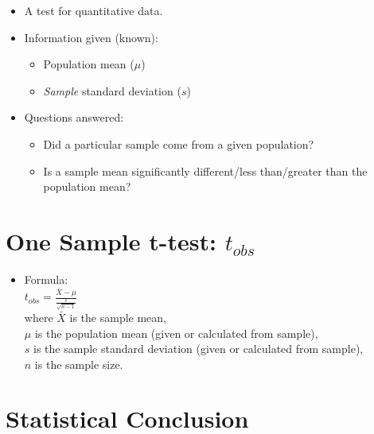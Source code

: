 \documentclass[12pt]{article}
\begin{document}
\begin{itemize}
\itemsep1pt\parskip0pt
\item
  A test for quantitative data.
\item
  Information given (known):

  \begin{itemize}
  \itemsep1pt\parskip0pt
  \item
    Population mean (\(\mu\))
  \item
    \emph{Sample} standard deviation (\(s\))
  \end{itemize}
\item
  Questions answered:

  \begin{itemize}
  \itemsep1pt\parskip0pt
  \item
    Did a particular sample come from a given population?
  \item
    Is a sample mean significantly different/less than/greater than the
    population mean?
  \end{itemize}
\end{itemize}

\section{\texorpdfstring{One Sample t-test:
\(t_{obs}\)}{One Sample t-test: t\_\{obs\}}}\label{one-sample-t-test-tux5fobs}

\begin{itemize}
\itemsep1pt\parskip0pt
\item
  Formula:\\\(t_{obs} = \frac{\bar{X} - \mu}{\frac{s}{\sqrt{n - 1}}}\)\\where
  \(\bar{X}\) is the sample mean,\\\(\mu\) is the population mean (given
  or calculated from sample),\\\(s\) is the sample standard deviation
  (given or calculated from sample),\\\(n\) is the sample size.
\end{itemize}

\section{Statistical Conclusion}\label{statistical-conclusion}
\end{document}
